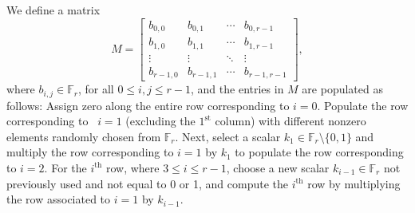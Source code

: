 \documentclass[conference]{IEEEtran}
\begin{document}
We define a matrix
\begin{equation}\label{model_matrix}
   M =
\begin{bmatrix}
b_{0,0} & b_{0,1}& \cdots & b_{0,r-1} \\
b_{1,0} & b_{1,1} & \cdots & b_{1,r-1} \\
\vdots  & \vdots    & \ddots  & \vdots \\
b_{r-1,0} & b_{r-1,1} & \cdots & b_{r-1,r-1}
\end{bmatrix},
\end{equation}
 where $b_{i,j} \in \mathbb{F}_{r}$, for all $0 \leq i,j \leq r-1$, and the entries in $M$ are populated as follows:
Assign zero along the entire row corresponding to $i=0$. Populate the row corresponding to ~$i=1$ (excluding the $1^{\mathrm{st}}$ column) with different nonzero elements randomly chosen from $\mathbb{F}_r$. Next, select a scalar $k_1 \in \mathbb{F}_r \setminus \{0, 1\}$ and multiply the row corresponding to $i=1$ by $k_{1}$ to populate the row corresponding to $i=2$. For the $i^{\text{th}}$ row, where $3\leq i\leq r-1$, choose a new scalar $k_{i-1} \in \mathbb{F}_r$ not previously used and not equal to 0 or 1, and compute the $i^{\mathrm{th}}$ row by multiplying the row associated to $i=1$ by $k_{i-1}$. 
\end{document}
